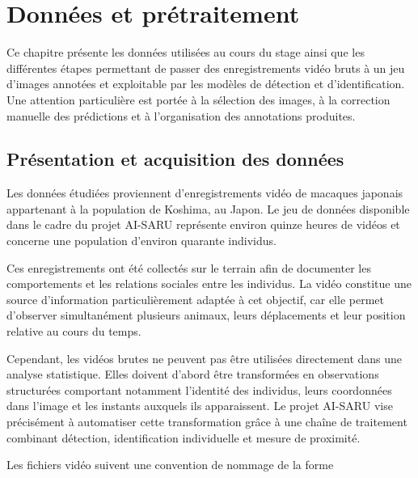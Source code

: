 \documentclass[11pt,a4paper]{report}
\begin{document}

\chapter{Données et prétraitement}
\label{chap:donnees}

Ce chapitre présente les données utilisées au cours du stage ainsi que les
différentes étapes permettant de passer des enregistrements vidéo bruts à un
jeu d'images annotées et exploitable par les modèles de détection et
d'identification. Une attention particulière est portée à la sélection des
images, à la correction manuelle des prédictions et à l'organisation des
annotations produites.

\section{Présentation et acquisition des données}

Les données étudiées proviennent d'enregistrements vidéo de macaques japonais
appartenant à la population de Koshima, au Japon. Le jeu de données disponible
dans le cadre du projet AI-SARU représente environ quinze heures de vidéos et
concerne une population d'environ quarante individus.

Ces enregistrements ont été collectés sur le terrain afin de documenter les
comportements et les relations sociales entre les individus. La vidéo constitue
une source d'information particulièrement adaptée à cet objectif, car elle
permet d'observer simultanément plusieurs animaux, leurs déplacements et leur
position relative au cours du temps.

Cependant, les vidéos brutes ne peuvent pas être utilisées directement dans
une analyse statistique. Elles doivent d'abord être transformées en
observations structurées comportant notamment l'identité des individus, leurs
coordonnées dans l'image et les instants auxquels ils apparaissent. Le projet
AI-SARU vise précisément à automatiser cette transformation grâce à une chaîne
de traitement combinant détection, identification individuelle et mesure de
proximité.

Les fichiers vidéo suivent une convention de nommage de la forme
\end{document}
